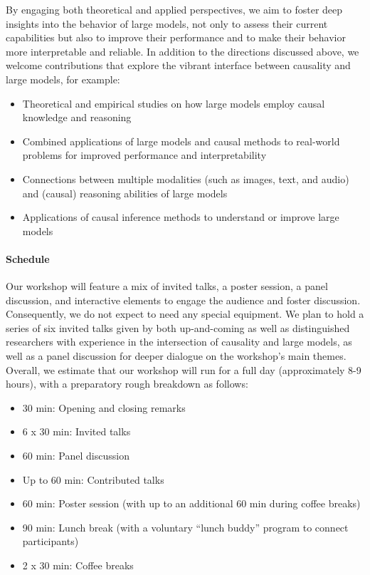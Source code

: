 \documentclass{article}
\begin{document}
By engaging both theoretical and applied perspectives, we aim to foster deep insights into the behavior of large models, not only to assess their current capabilities but also to improve their performance and to make their behavior more interpretable and reliable. In addition to the directions discussed above, we welcome contributions that explore the vibrant interface between causality and large models, for example:

\begin{itemize}[nolistsep]
    \item Theoretical and empirical studies on how large models employ causal knowledge and reasoning
    \item Combined applications of large models and causal methods to real-world problems for improved performance and interpretability 
    \item Connections between multiple modalities (such as images, text, and audio) and (causal) reasoning abilities of large models
    \item Applications of causal inference methods to understand or improve large models
\end{itemize}



\paragraph{Schedule}

Our workshop will feature a mix of invited talks, a poster session, a panel discussion, and interactive elements to engage the audience and foster discussion. Consequently, we do not expect to need any special equipment.
We plan to hold a series of six invited talks given by both up-and-coming as well as distinguished researchers with experience in the intersection of causality and large models, as well as a panel discussion for deeper dialogue on the workshop's main themes. Overall, we estimate that our workshop will run for a full day (approximately 8-9 hours), with a preparatory rough breakdown as follows:


\begin{itemize}[nolistsep]
    \item 30 min: Opening and closing remarks
    \item 6 x 30 min: Invited talks
    \item 60 min: Panel discussion
    \item Up to 60 min: Contributed talks
    \item 60 min: Poster session (with up to an additional 60 min during coffee breaks)
    \item 90 min: Lunch break (with a voluntary ``lunch buddy'' program to connect participants)
    \item 2 x 30 min: Coffee breaks
\end{itemize}
\end{document}
